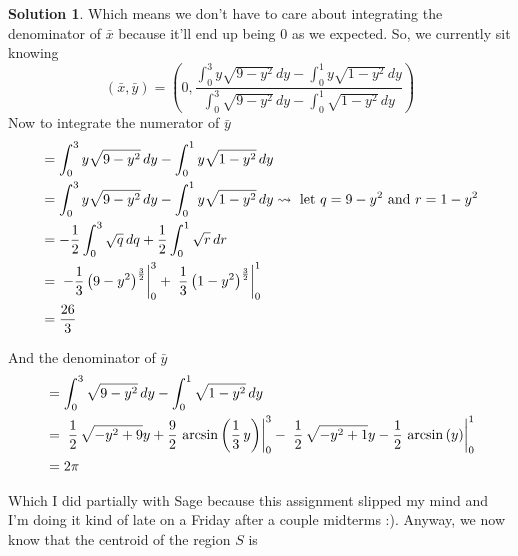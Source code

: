 \documentclass[10pt]{article}
\theoremstyle{definition}
\newtheorem{soln}{Solution}
\begin{document}
\begin{soln}
    \noindent Which means we don't have to care about integrating the denominator of $\bar{x}$ because it'll end up being $0$ as we expected. So, we currently sit knowing
    $$(\bar{x}, \bar{y})=\left(0, \frac{\int_{0}^{3} y\sqrt{9-y^{2}}\, dy - \int_{0}^{1} y\sqrt{1-y^{2}}\, dy}{\int_{0}^{3} \sqrt{9-y^{2}}\, dy - \int_{0}^{1} \sqrt{1-y^{2}}\, dy}\right)$$
    \noindent Now to integrate the numerator of $\bar{y}$
    \begin{align*}
         & = \int_{0}^{3} y\sqrt{9-y^{2}}\, dy - \int_{0}^{1} y\sqrt{1-y^{2}}\, dy                                                             \\
         & = \int_{0}^{3} y\sqrt{9-y^{2}}\, dy - \int_{0}^{1} y\sqrt{1-y^{2}}\, dy \rightsquigarrow \text{ let } q=9-y^2 \text { and } r=1-y^2 \\
         & = -\frac{1}{2}\int_{0}^{3} \sqrt{q}\, dq + \frac{1}{2}\int_{0}^{1} \sqrt{r}\, dr                                                    \\
         & = \eval*{-\frac{1}{3}\left(9-y^2\right)^{\frac{3}{2}}}_{0}^{3} + \eval*{\frac{1}{3}\left(1-y^2\right)^{\frac{3}{2}}}_{0}^{1}        \\
         & = \frac{26}{3}                                                                                                                      \\
    \end{align*}

    \noindent And the denominator of $\bar{y}$
    \begin{align*}
         & = \int_{0}^{3} \sqrt{9-y^{2}}\, dy - \int_{0}^{1} \sqrt{1-y^{2}}\, dy                                                                                                                                  \\
         & = \eval*{\frac{1}{2} \, \sqrt{-y^{2} + 9} y + \frac{9}{2} \, \arcsin\left(\frac{1}{3} \, y\right)}_{0}^{3} - \eval*{\frac{1}{2} \, \sqrt{-y^{2} + 1} y - \frac{1}{2} \, \arcsin\left(y\right)}_{0}^{1} \\
         & = 2\pi                                                                                                                                                                                                 \\
    \end{align*}

    \noindent Which I did partially with Sage because this assignment slipped my mind and I'm doing it kind of late on a Friday after a couple midterms :). Anyway, we now know that the centroid of the region $S$ is


\end{soln}
\end{document}
